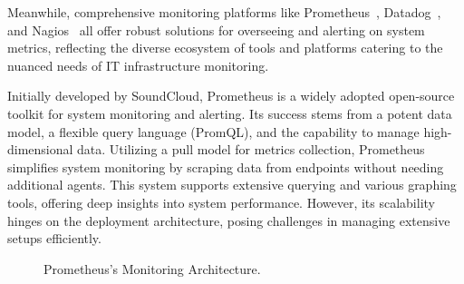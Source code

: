 Meanwhile, comprehensive monitoring platforms like Prometheus~\parencite{PrometheusMonitoringSystem}, Datadog~\parencite{CloudMonitoringService}, and Nagios~\parencite{NagiosOpenSource} all offer robust solutions for overseeing and alerting on system metrics, reflecting the diverse ecosystem of tools and platforms catering to the nuanced needs of IT infrastructure monitoring. 

Initially developed by SoundCloud, Prometheus is a widely adopted open-source toolkit for system monitoring and alerting. Its success stems from a potent data model, a flexible query language (PromQL), and the capability to manage high-dimensional data. Utilizing a pull model for metrics collection, Prometheus simplifies system monitoring by scraping data from endpoints without needing additional agents. This system supports extensive querying and various graphing tools, offering deep insights into system performance. However, its scalability hinges on the deployment architecture, posing challenges in managing extensive setups efficiently. 

\begin{figure}[htpb]
  \centering
  \caption[Prometheus's Monitoring Architecture]{Prometheus's Monitoring Architecture.}\label{fig:prometheus-monitoring-architecture}
\end{figure}

